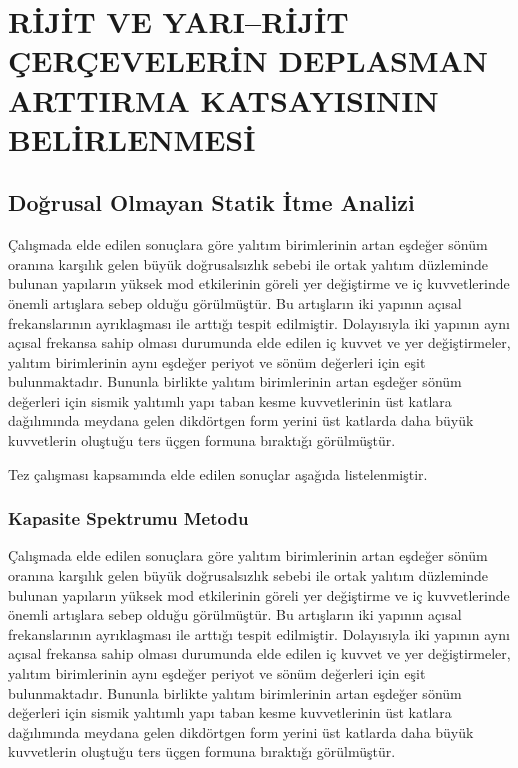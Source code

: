 
\chapter{RİJİT VE YARI--RİJİT ÇERÇEVELERİN DEPLASMAN ARTTIRMA KATSAYISININ
BELİRLENMESİ}

\section{Doğrusal Olmayan Statik İtme Analizi}

Çalışmada elde edilen sonuçlara göre yalıtım birimlerinin artan eşdeğer
sönüm oranına karşılık gelen büyük doğrusalsızlık sebebi ile ortak
yalıtım düzleminde bulunan yapıların yüksek mod etkilerinin göreli
yer değiştirme ve iç kuvvetlerinde önemli artışlara sebep olduğu görülmüştür.
Bu artışların iki yapının açısal frekanslarının ayrıklaşması ile arttığı
tespit edilmiştir. Dolayısıyla iki yapının aynı açısal frekansa sahip
olması durumunda elde edilen iç kuvvet ve yer değiştirmeler, yalıtım
birimlerinin aynı eşdeğer periyot ve sönüm değerleri için eşit bulunmaktadır.
Bununla birlikte yalıtım birimlerinin artan eşdeğer sönüm değerleri
için sismik yalıtımlı yapı taban kesme kuvvetlerinin üst katlara dağılımında
meydana gelen dikdörtgen form yerini üst katlarda daha büyük kuvvetlerin
oluştuğu ters üçgen formuna bıraktığı görülmüştür.

Tez çalışması kapsamında elde edilen sonuçlar aşağıda listelenmiştir. 

\subsection{Kapasite Spektrumu Metodu}

Çalışmada elde edilen sonuçlara göre yalıtım birimlerinin artan eşdeğer
sönüm oranına karşılık gelen büyük doğrusalsızlık sebebi ile ortak
yalıtım düzleminde bulunan yapıların yüksek mod etkilerinin göreli
yer değiştirme ve iç kuvvetlerinde önemli artışlara sebep olduğu görülmüştür.
Bu artışların iki yapının açısal frekanslarının ayrıklaşması ile arttığı
tespit edilmiştir. Dolayısıyla iki yapının aynı açısal frekansa sahip
olması durumunda elde edilen iç kuvvet ve yer değiştirmeler, yalıtım
birimlerinin aynı eşdeğer periyot ve sönüm değerleri için eşit bulunmaktadır.
Bununla birlikte yalıtım birimlerinin artan eşdeğer sönüm değerleri
için sismik yalıtımlı yapı taban kesme kuvvetlerinin üst katlara dağılımında
meydana gelen dikdörtgen form yerini üst katlarda daha büyük kuvvetlerin
oluştuğu ters üçgen formuna bıraktığı görülmüştür.


